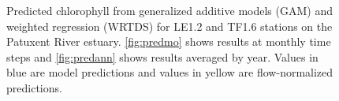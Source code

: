 \documentclass[letterpaper,12pt,oneside]{article}\usepackage[]{graphicx}\usepackage[]{color}
\begin{document}
\begin{figure}
\centering
{}


\caption{Predicted chlorophyll from generalized additive models (GAM) and weighted regression (WRTDS) for LE1.2 and TF1.6 stations on the Patuxent River estuary.  \cref{fig:predmo} shows results at monthly time steps and \cref{fig:predann} shows results averaged by year.  Values in blue are model predictions and values in yellow are flow-normalized predictions.}
\label{fig:pred}
\end{figure}
\end{document}
